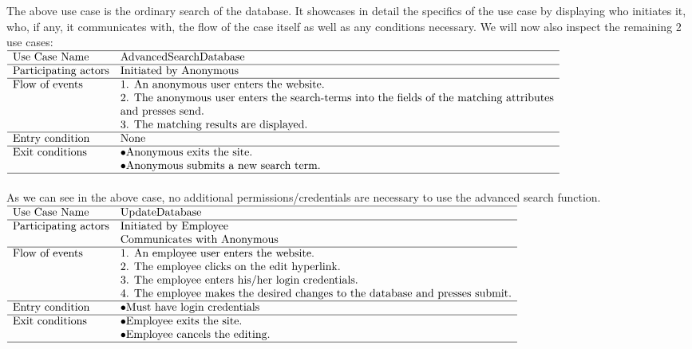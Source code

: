 \documentclass[12pt,a4paper]{article}
\begin{document}
The above use case is the ordinary search of the database. It showcases in detail the specifics of the use case by displaying who initiates it, who, if any, it communicates with, the flow of the case itself as well as any conditions necessary.
We will now also inspect the remaining 2 use cases:\\

$\begin{array}{ll}
\hline
\text{Use Case Name}	& \text{AdvancedSearchDatabase}\\
\hline
\text{Participating
	actors}	& \text{Initiated by Anonymous}\\
\hline
\text{Flow of events}	& \text{1. An anonymous user enters the website.}\\
& \text{2. The anonymous user enters the search-terms into the fields of the matching attributes} \\
& \text{and presses send.}\\
& \text{3. The matching results are displayed.}\\
\hline
\text{Entry condition}	& \text{None}\\
\hline
\text{Exit conditions}	& \bullet \text{Anonymous exits the site.}\\
& \bullet \text{Anonymous submits a new search term.}\\
\hline
\end{array}$\\
\\
As we can see in the above case, no additional permissions/credentials are necessary to use the advanced search function.\\

$\begin{array}{ll}
\hline
\text{Use Case Name}	& \text{UpdateDatabase}\\
\hline
\text{Participating
	actors}	& \text{Initiated by Employee}\\
& \text{Communicates with Anonymous}\\
\hline
\text{Flow of events}	& \text{1. An employee user enters the website.}\\
& \text{2. The employee clicks on the edit hyperlink.} \\
& \text{3. The employee enters his/her login credentials.}\\
& \text{4. The employee makes the desired changes to the database and presses submit.}\\
\hline
\text{Entry condition}	& \bullet \text{Must have login credentials}\\
\hline
\text{Exit conditions}	& \bullet \text{Employee exits the site.}\\
& \bullet \text{Employee cancels the editing.}\\
\hline
\end{array}$
\\
\end{document}
